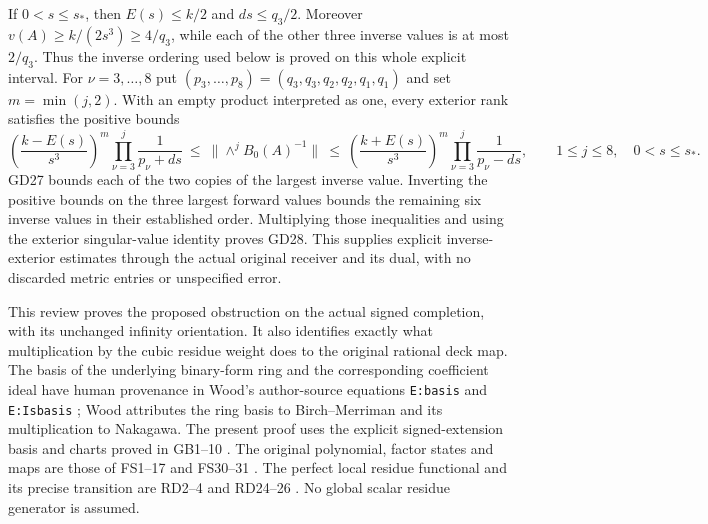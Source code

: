 \documentclass[11pt]{article}
\begin{document}
If $0<s\le s_*$, then $E(s)\le k/2$ and $ds\le q_3/2$.
Moreover $v(A)\ge k/(2s^3)\ge4/q_3$, while each of the
other three inverse values is at most $2/q_3$.
Thus the inverse ordering used below is proved on this
whole explicit interval. For $\nu=3,\ldots,8$ put
$(p_3,\ldots,p_8)=(q_3,q_3,q_2,q_2,q_1,q_1)$ and set
$m=\min(j,2)$. With an empty product interpreted as one,
every exterior rank satisfies the positive bounds
\begin{equation}
 \left(\frac{k-E(s)}{s^3}\right)^m
       \prod_{\nu=3}^{j}\frac1{p_\nu+ds}
 \ \le\ \|\wedge^jB_0(A)^{-1}\|
 \ \le\
 \left(\frac{k+E(s)}{s^3}\right)^m
       \prod_{\nu=3}^{j}\frac1{p_\nu-ds},
 \qquad 1\le j\le8,\quad0<s\le s_*.
 \tag{GD28}
\end{equation}
GD27 bounds each of the two copies of the largest inverse
value. Inverting the positive bounds on the three largest
forward values bounds the remaining six inverse values
in their established order. Multiplying those inequalities
and using the exterior singular-value identity proves
GD28. This supplies explicit inverse-exterior estimates
through the actual original receiver and its dual,
with no discarded metric entries or unspecified error.



This review proves the proposed obstruction on the actual signed
completion, with its unchanged infinity orientation. It also identifies
exactly what multiplication by the cubic residue weight does to the
original rational deck map. The basis of the underlying binary-form
ring and the corresponding coefficient ideal have human provenance
in Wood's author-source equations \texttt{E:basis} and
\texttt{E:Isbasis} \cite{WoodBinary}; Wood attributes the ring basis to
Birch--Merriman and its multiplication to Nakagawa. The present
proof uses the explicit signed-extension basis and charts proved in
GB1--10 \cite{Fable042}. The original polynomial, factor states and maps
are those of FS1--17 and FS30--31 \cite{Fable037}. The perfect local
residue functional and its precise transition are RD2--4 and
RD24--26 \cite{Fable037}. No global scalar residue generator is assumed.
\end{document}
